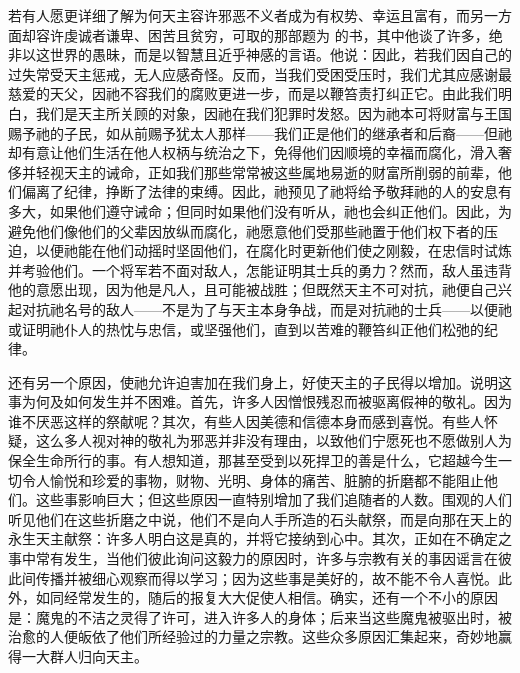 若有人愿更详细了解为何天主容许邪恶不义者成为有权势、幸运且富有，而另一方面却容许虔诚者谦卑、困苦且贫穷，可取的那部题为  的书，其中他谈了许多，绝非以这世界的愚昧，而是以智慧且近乎神感的言语。他说：因此，若我们因自己的过失常受天主惩戒，无人应感奇怪。反而，当我们受困受压时，我们尤其应感谢最慈爱的天父，因祂不容我们的腐败更进一步，而是以鞭笞责打纠正它。由此我们明白，我们是天主所关顾的对象，因祂在我们犯罪时发怒。因为祂本可将财富与王国赐予祂的子民，如从前赐予犹太人那样——我们正是他们的继承者和后裔——但祂却有意让他们生活在他人权柄与统治之下，免得他们因顺境的幸福而腐化，滑入奢侈并轻视天主的诫命，正如我们那些常常被这些属地易逝的财富所削弱的前辈，他们偏离了纪律，挣断了法律的束缚。因此，祂预见了祂将给予敬拜祂的人的安息有多大，如果他们遵守诫命；但同时如果他们没有听从，祂也会纠正他们。因此，为避免他们像他们的父辈因放纵而腐化，祂愿意他们受那些祂置于他们权下者的压迫，以便祂能在他们动摇时坚固他们，在腐化时更新他们使之刚毅，在忠信时试炼并考验他们。一个将军若不面对敌人，怎能证明其士兵的勇力？然而，敌人虽违背他的意愿出现，因为他是凡人，且可能被战胜；但既然天主不可对抗，祂便自己兴起对抗祂名号的敌人——不是为了与天主本身争战，而是对抗祂的士兵——以便祂或证明祂仆人的热忱与忠信，或坚强他们，直到以苦难的鞭笞纠正他们松弛的纪律。\par

还有另一个原因，使祂允许迫害加在我们身上，好使天主的子民得以增加。说明这事为何及如何发生并不困难。首先，许多人因憎恨残忍而被驱离假神的敬礼。因为谁不厌恶这样的祭献呢？其次，有些人因美德和信德本身而感到喜悦。有些人怀疑，这么多人视对神的敬礼为邪恶并非没有理由，以致他们宁愿死也不愿做别人为保全生命所行的事。有人想知道，那甚至受到以死捍卫的善是什么，它超越今生一切令人愉悦和珍爱的事物，财物、光明、身体的痛苦、脏腑的折磨都不能阻止他们。这些事影响巨大；但这些原因一直特别增加了我们追随者的人数。围观的人们听见他们在这些折磨之中说，他们不是向人手所造的石头献祭，而是向那在天上的永生天主献祭：许多人明白这是真的，并将它接纳到心中。其次，正如在不确定之事中常有发生，当他们彼此询问这毅力的原因时，许多与宗教有关的事因谣言在彼此间传播并被细心观察而得以学习；因为这些事是美好的，故不能不令人喜悦。此外，如同经常发生的，随后的报复大大促使人相信。确实，还有一个不小的原因是：魔鬼的不洁之灵得了许可，进入许多人的身体；后来当这些魔鬼被驱出时，被治愈的人便皈依了他们所经验过的力量之宗教。这些众多原因汇集起来，奇妙地赢得一大群人归向天主。\par

